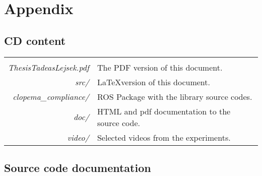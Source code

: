 %
\chapter{Appendix} 
\label{sec:appendix}

\section{CD content}
    \begin{tabular}{rl}
    & \\[.5cm]
      \textit{ThesisTadeasLejsek.pdf} & The PDF version of this document.\\
        \textit{src/} & \LaTeX version of this document.\\
        \textit{clopema\_compliance/} & ROS Package with the library source codes.\\
        \textit{doc/} & HTML and pdf documentation to the source code.\\
        \textit{video/} & Selected videos from the experiments.\\
    \end{tabular}
    \clearpage

\section{Source code documentation}
     
%     